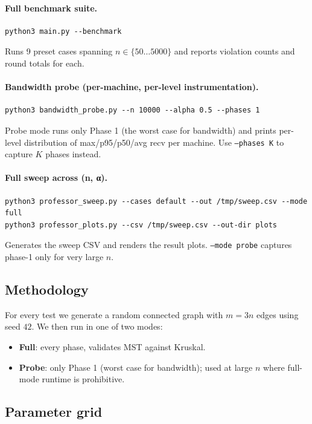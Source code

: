 \documentclass[11pt]{article}
\begin{document}
\paragraph{Full benchmark suite.}
\begin{verbatim}
python3 main.py --benchmark
\end{verbatim}
Runs 9 preset cases spanning $n \in \{50 \ldots 5000\}$ and reports
violation counts and round totals for each.

\paragraph{Bandwidth probe (per-machine, per-level instrumentation).}
\begin{verbatim}
python3 bandwidth_probe.py --n 10000 --alpha 0.5 --phases 1
\end{verbatim}
Probe mode runs only Phase 1 (the worst case for bandwidth) and prints
per-level distribution of max/p95/p50/avg recv per machine. Use
\texttt{--phases K} to capture $K$ phases instead.

\paragraph{Full sweep across (n, α).}
\begin{verbatim}
python3 professor_sweep.py --cases default --out /tmp/sweep.csv --mode full
python3 professor_plots.py --csv /tmp/sweep.csv --out-dir plots
\end{verbatim}
Generates the sweep CSV and renders the result plots. \texttt{--mode probe}
captures phase-1 only for very large $n$.

\subsection{Methodology}

For every test we generate a random connected graph with $m = 3n$ edges
using seed $42$. We then run in one of two modes:
\begin{itemize}[topsep=2pt, itemsep=2pt, leftmargin=*]
    \item \textbf{Full}: every phase, validates MST against Kruskal.
    \item \textbf{Probe}: only Phase 1 (worst case for bandwidth); used at
          large $n$ where full-mode runtime is prohibitive.
\end{itemize}

\subsection{Parameter grid}
\end{document}
